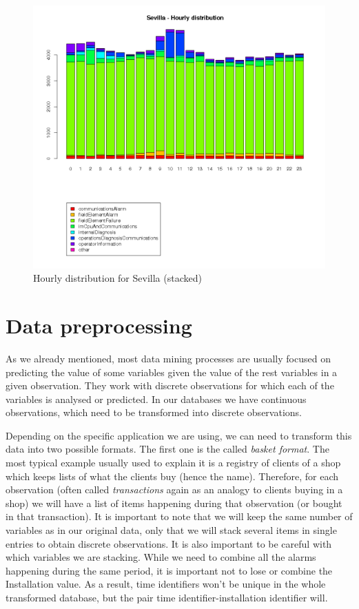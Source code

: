 \begin{figure}[htb]
 \centering
 \includegraphics[width=\textwidth]{./img/sevilla_timeline.png}
 \caption{Hourly distribution for Sevilla (stacked)} \label{fig:sevilla_timeline}
\end{figure}

\clearpage

\section{Data preprocessing}\label{sec:data_preprocessing}
As we already mentioned, most data mining processes are usually focused on predicting the value of some variables given the value of the rest variables in a given observation. They work with discrete observations for which each of the variables is analysed or predicted. In our databases we have continuous observations, which need to be transformed into discrete observations\cite{zaki2001spade}.

Depending on the specific application we are using, we can need to transform this data into two possible formats. The first one is the called \emph{basket format}. The most typical example usually used to explain it is a registry of clients of a shop which keeps lists of what the clients buy (hence the name). Therefore, for each observation (often called \emph{transactions} again as an analogy to clients buying in a shop) we will have a list of items happening during that observation (or bought in that transaction). It is important to note that we will keep the same number of variables as in our original data, only that we will stack several items in single entries to obtain discrete observations. It is also important to be careful with which variables we are stacking. While we need to combine all the alarms happening during the same period, it is important not to lose or combine the Installation value. As a result, time identifiers won't be unique in the whole transformed database, but the pair time identifier-installation identifier will.

